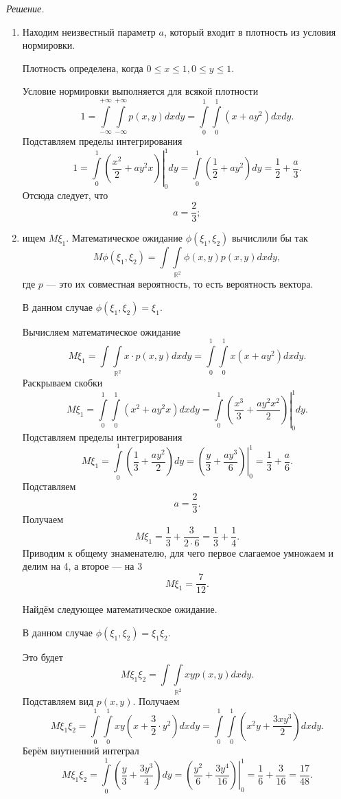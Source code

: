 \textit{Решение.}
\begin{enumerate}[label=\alph*)]
\item Находим неизвестный параметр $a$, который входит в плотность из условия нормировки.

Плотность определена, когда $0 \leq x \leq 1, 0 \leq y \leq 1$.

Условие нормировки выполняется для всякой плотности
$$1 =
\int \limits_{- \infty }^{+ \infty } \int \limits_{- \infty }^{+ \infty } p \left( x, y \right) dxdy =
\int \limits_0^1 \int \limits_0^1 \left( x+ay^2 \right) dxdy.$$
Подставляем пределы интегрирования
$$1 =
\left. \int \limits_0^1 \left( \frac{x^2}{2} + ay^2 x \right) \right|_0^1 dy =
\int \limits_0^1 \left( \frac{1}{2} + ay^2 \right) dy =
\frac{1}{2} + \frac{a}{3}.$$
Отсюда следует, что
$$a =
\frac{2}{3};$$
\item ищем $M \xi_1$.
Математическое ожидание $ \phi \left( \xi_1, \xi_2 \right) $ вычислили бы так
$$M \phi \left( \xi_1, \xi_2 \right) =
\int \int \limits_{ \mathbb{R}^2} \phi \left( x, y \right) p \left( x, y \right) dxdy,$$
где $p$ --- это их совместная вероятность, то есть вероятность вектора.

В данном случае $ \phi \left( \xi_1, \xi_2 \right) = \xi_1$.

Вычисляем математическое ожидание
$$M \xi_1 =
\int \int \limits_{ \mathbb{R}^2} x \cdot p \left( x, y \right) dxdy =
\int \limits_0^1 \int \limits_0^1 x \left( x + ay^2 \right) dxdy.$$
Раскрываем скобки
$$M \xi_1 =
\int \limits_0^1 \int \limits_0^1 \left( x^2 + ay^2 x \right) dxdy =
\left. \int \limits_0^1 \left( \frac{x^3}{3} + \frac{ay^2 x^2}{2} \right) \right|_0^1 dy.$$
Подставляем пределы интегрирования
$$M \xi_1 =
\int \limits_0^1 \left( \frac{1}{3} + \frac{ay^2}{2} \right) dy =
\left. \left( \frac{y}{3} + \frac{ay^3}{6} \right) \right|_0^1 =
\frac{1}{3} + \frac{a}{6}.$$
Подставляем
$$a =
\frac{2}{3}.$$
Получаем
$$M \xi_1 =
\frac{1}{3} + \frac{3}{2 \cdot 6} =
\frac{1}{3} + \frac{1}{4}.$$
Приводим к общему знаменателю, для чего первое слагаемое умножаем и делим на 4, а второе --- на 3
$$M \xi_1 =
\frac{7}{12}.$$

Найдём следующее математическое ожидание.

В данном случае $ \phi \left( \xi_1, \xi_2 \right) = \xi_1 \xi_2$.

Это будет
$$M \xi_1 \xi_2 =
\int \int \limits_{ \mathbb{R}^2} xyp \left( x, y \right) dxdy.$$
Подставляем вид $p \left( x, y \right) $.
Получаем
$$M \xi_1 \xi_2 =
\int \limits_0^1 \int \limits_0^1 xy \left( x + \frac{3}{2} \cdot y^2 \right) dxdy =
\int \limits_0^1 \int \limits_0^1 \left( x^2 y + \frac{3xy^3}{2} \right) dxdy.$$
Берём внутненний интеграл
$$M \xi_1 \xi_2 =
\int \limits_0^1 \left( \frac{y}{3} + \frac{3y^3}{4} \right) dy =
\left. \left( \frac{y^2}{6} + \frac{3y^4}{16} \right) \right|_0^1 =
\frac{1}{6} + \frac{3}{16} =
\frac{17}{48}.$$


\end{enumerate}
